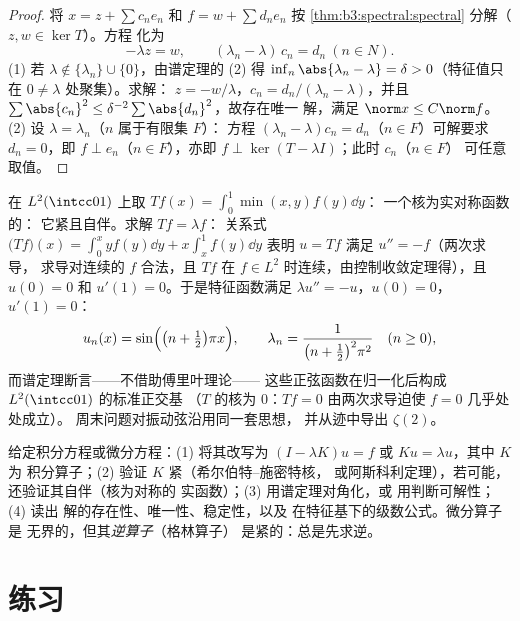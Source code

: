 \begin{proof}
将 $x = z + \sum c_ne_n$ 和 $f = w + \sum d_ne_n$ 按
\cref{thm:b3:spectral:spectral} 分解（$z, w \in \ker T$）。方程
化为
\[
-\lambda z = w, \qquad (\lambda_n - \lambda)\,c_n = d_n\
(n \in N).
\]
(1) 若 $\lambda \notin \{\lambda_n\}\cup\{0\}$，由谱定理的
(2) 得 $\inf_n\abs{\lambda_n - \lambda} = \delta >
0$（特征值只在 $0 \neq \lambda$ 处聚集）。求解：
$z = -w/\lambda$，$c_n = d_n/(\lambda_n - \lambda)$，并且
$\sum\abs{c_n}^2 \leq \delta^{-2}\sum\abs{d_n}^2$，故存在唯一
解，满足 $\norm x \leq C\norm f$。
(2) 设 $\lambda = \lambda_{n}$（$n$ 属于有限集 $F$）：
方程 $(\lambda_n - \lambda)c_n = d_n$（$n \in F$）可解要求
$d_n = 0$，即 $f \perp e_n$（$n \in F$），亦即 $f
\perp \ker(T - \lambda I)$；此时 $c_n$（$n \in F$）
可任意取值。
\end{proof}

\begin{example}\label{ex:b3:spectral:minxy}
在 $L^2(\intcc01)$ 上取 $Tf(x) = \int_0^1\min(x, y)f(y)\dd y$：
一个核为实对称函数的：
它紧且自伴。求解 $Tf = \lambda f$：
关系式 $\bigl(Tf\bigr)(x) = \int_0^xyf(y)\dd y +
x\int_x^1f(y)\dd y$ 表明 $u = Tf$ 满足 $u'' = -f$（两次求导，
求导对连续的 $f$ 合法，且 $Tf$ 在
$f \in L^2$ 时连续，由控制收敛定理得），且 $u(0)
= 0$ 和 $u'(1) = 0$。于是特征函数满足 $\lambda u'' =
-u$，$u(0) = 0$，$u'(1) = 0$：
\[
u_n(x) = \sin\Bigl(\bigl(n + \tfrac12\bigr)\pi x\Bigr),
\qquad
\lambda_n = \frac{1}{\bigl(n + \frac12\bigr)^2\pi^2}
\quad (n \geq 0),
\]
而谱定理断言——不借助傅里叶理论——
这些正弦函数在归一化后构成 $L^2(\intcc01)$ 的标准正交基
（$T$ 的核为 $0$：$Tf = 0$
由两次求导迫使 $f = 0$ 几乎处处成立）。
周末问题对振动弦沿用同一套思想，
并从迹中导出 $\zeta(2)$。
\end{example}

\begin{method}\label{met:b3:spectral:method}
给定积分方程或微分方程：(1) 将其改写为
$(I - \lambda K)u = f$ 或 $Ku = \lambda u$，其中 $K$ 为
积分算子；(2) 验证 $K$ 紧（希尔伯特–施密特核，
或阿斯科利定理），若可能，还验证其自伴（核为对称的
实函数）；(3) 用谱定理对角化，或
用判断可解性；(4) 读出
解的存在性、唯一性、稳定性，以及
在特征基下的级数公式。微分算子是
无界的，但其\emph{逆算子}（格林算子）
是紧的：总是先求逆。
\end{method}

\section{练习}

